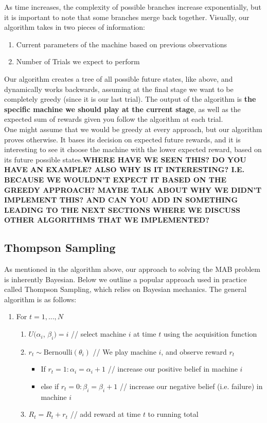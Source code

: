 \documentclass{article}
\begin{document}
As time increases, the complexity of possible branches increase exponentially, but it is important to note that some branches merge back together. Visually, our algorithm takes in two pieces of information:

\begin{enumerate}
\item Current parameters of the machine based on previous observations
\item Number of Trials we expect to perform
\end{enumerate}

Our algorithm creates a tree of all possible future states, like above, and dynamically works backwards, assuming at the final stage we want to be completely greedy (since it is our last trial). The output of the algorithm is \textbf{the specific machine we should play at the current stage}, as well as the expected sum of rewards given you follow the algorithm at each trial.\\

One might assume that we would be greedy at every approach, but our algorithm proves otherwise. It bases its decision on expected future rewards, and it is interesting to see it choose the machine with the lower expected reward, based on its future possible states.\textbf{WHERE HAVE WE SEEN THIS? DO YOU HAVE AN EXAMPLE? ALSO WHY IS IT INTERESTING? I.E. BECAUSE WE WOULDN'T EXPECT IT BASED ON THE GREEDY APPROACH? MAYBE TALK ABOUT WHY WE DIDN'T IMPLEMENT THIS? AND CAN YOU ADD IN SOMETHING LEADING TO THE NEXT SECTIONS WHERE WE DISCUSS OTHER ALGORITHMS THAT WE IMPLEMENTED?}

\subsection{Thompson Sampling}

As mentioned in the algorithm above, our approach to solving the MAB problem is inherently Bayesian. Below we outline a popular approach used in practice called Thompson Sampling, which relies on Bayesian mechanics. The general algorithm is as follows:

\begin{enumerate}
\item For $t = 1, ..., N$
	\begin{enumerate}
	\item $U(\alpha_i$, $\beta_i) = i$  // select machine $i$ at time $t$ using the acquisition function
	\item $r_t \sim \text{Bernoulli}(\theta_{i})$   // We play machine $i$, and observe reward $r_t$
	\begin{itemize}
		\item If $r_t = 1: \alpha_i = \alpha_i + 1$   // increase our positive belief in machine $i$
		\item else if $r_t = 0: \beta_i = \beta_i + 1$  // increase our negative belief (i.e. failure) in machine $i$
	\end{itemize}
	\item $R_t = R_t + r_t$		// add reward at time $t$ to running total
	\end{enumerate}
\end{enumerate}
\end{document}
